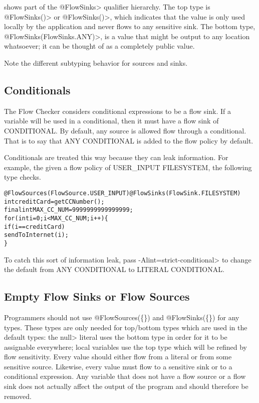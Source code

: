  shows part of the \<@FlowSinks>
qualifier hierarchy.  The top type is \<@FlowSinks(\ttcbs)> or
\<@FlowSinks()>, which indicates
that the value is only used locally by the application and never flows to
any sensitive sink.  The bottom type, \<@FlowSinks(FlowSinks.ANY)>, is a
value that might be output to any location whatsoever; it can be thought of
as a completely public value.

Note the different subtyping behavior for sources and sinks.




\subsection{Conditionals\label{sec:conditionals}}

The Flow Checker considers conditional expressions to be a flow sink.  If a variable 
will be used in a conditional, then it must have a flow sink of CONDITIONAL.  By default, 
any source is allowed flow through a conditional.  That is to say that 
ANY \flowsto{} CONDITIONAL is added to the flow policy by default. 

Conditionals are treated this way because they can leak information. For example, the given a flow policy of  USER\_INPUT \flowsto{} FILESYSTEM, the following type checks.

\begin{alltt}
@FlowSources(FlowSource.USER_INPUT) @FlowSinks(FlowSink.FILESYSTEM)
int creditCard = getCCNumber();
final int MAX\_CC\_NUM = 9999999999999999;
for (int i = 0 ; i < MAX\_CC\_NUM ; i++)\{
   if (i == creditCard)
        sendToInternet(i);
\}
\end{alltt}

To catch this sort of information leak, pass
 \<-Alint=strict-conditional> to change the default from ANY \flowsto{} CONDITIONAL to 
 LITERAL \flowsto{} CONDITIONAL. 



\subsection{Empty Flow Sinks or Flow Sources\label{sec:emptyflow}}

Programmers should not use @FlowSources(\{\}) and @FlowSinks(\{\}) for
any types.
These types are only needed for top/bottom types which are used in the
default types: the \<null> literal uses the bottom type in order for
it to be assignable everywhere; local variables use the top type which
will be refined by flow sensitivity.
Every value should either flow from a literal or from some sensitive
source.  Likewise, every value must flow to a sensitive sink or to a
conditional expression.  Any variable that does not have a flow source
or a flow sink does not actually affect the output of the program and
should therefore be removed.
  
